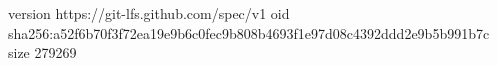 version https://git-lfs.github.com/spec/v1
oid sha256:a52f6b70f3f72ea19e9b6c0fec9b808b4693f1e97d08c4392ddd2e9b5b991b7c
size 279269
